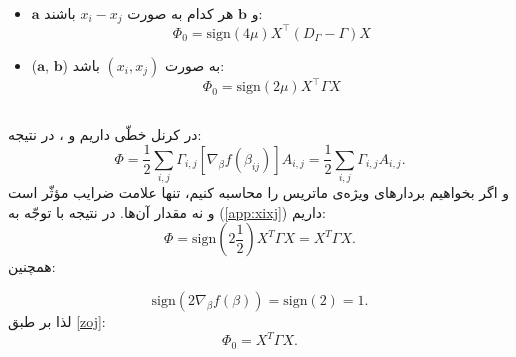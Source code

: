 \begin{itemize}
\item 
$\mathbf{a}$
و 
$\mathbf{b}$
هر کدام به صورت 
$x_i - x_j$
باشند:
\begin{equation}
\label{zoj}
\Phi_0 = \mathrm{sign}(4\mu) X^\top (D_\Gamma - \Gamma)X
\end{equation}

\item 
($\mathbf{a}$,
$\mathbf{b}$)
به صورت 
$(x_i, x_j)$
باشد:
\begin{equation}
\Phi_0 = \mathrm{sign}(2\mu) X^\top \Gamma X
\end{equation}

\end{itemize}


\subsection{}
در کرنل خطّی داریم 
و
،
در نتیجه:
\begin{equation}
\Phi = \frac{1}{2}\sum_{i,j} \Gamma_{i,j}[\nabla_\beta f(\beta_{ij})] A_{i,j} 
= \frac{1}{2}\sum_{i,j} \Gamma_{i,j} A_{i,j}.
\end{equation}
و اگر بخواهیم بردارهای ویژه‌ی ماتریس
\lr{$\Phi$}
را محاسبه کنیم، تنها علامت ضرایب مؤثّر است و نه مقدار آن‌ها. در نتیجه با توجّه به 
(\ref{app:xixj})
داریم:
\begin{equation}
\Phi = \text{sign}(2\frac{1}{2}) X^T\Gamma X = X^T\Gamma X.
\end{equation}
همچنین:

\begin{equation}
\mathrm{sign}(2 \nabla_\beta f(\beta)) = \mathrm{sign}(2) = 1.
\end{equation}
لذا بر طبق
\eqref{zoj}:
\begin{equation}
\Phi_0 = X^T\Gamma X.
\end{equation}


